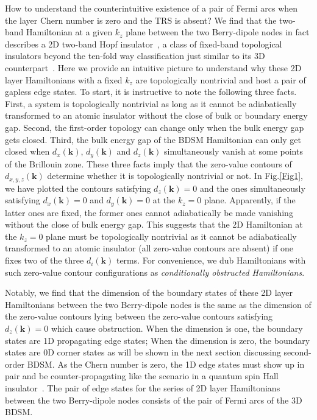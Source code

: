 \documentclass[aps,prl,twocolumn,longbibliography]{revtex4-1}
\newcommand{\bk}{\boldsymbol k}
\begin{document}
How to understand the counterintuitive existence of a pair of Fermi arcs when the layer
Chern number is zero and the TRS is absent?
We find that the two-band Hamiltonian at a given $k_{z}$ plane between the two Berry-dipole nodes
in fact describes a 2D two-band Hopf insulator~\cite{Wang2015hopf}, a class of fixed-band topological insulators beyond
the ten-fold way classification just similar to its 3D counterpart~\cite{Moore2008hopf,Schnyder2008,kitaev2009periodic,Ryu2010}.
Here we provide an intuitive picture
to understand why these 2D layer Hamiltonians with a fixed $k_{z}$ are topologically nontrivial and host
a pair of gapless edge states. To start, it is instructive to note the following three facts. First,
a system is topologically nontrivial as long as it cannot be adiabatically
transformed to an atomic insulator without the close of bulk or boundary energy gap.
Second, the first-order topology can change only when the bulk energy gap
gets closed. Third, the bulk energy gap of the BDSM Hamiltonian can only get closed
when $d_{x}(\bk)$, $d_{y}(\bk)$ and $d_{z}(\bk)$ simultaneously vanish
at some points of the Brillouin zone. These three facts
imply that the zero-value contours of $d_{x,y,z}(\bk)$ determine
whether it is topologically nontrivial or not.  In Fig.\ref{Fig1}, we have plotted the contours
satisfying $d_{z}(\bk)=0$ and the ones simultaneously satisfying $d_{x}(\bk)=0$
and $d_{y}(\bk)=0$  at the $k_{z}=0$ plane. Apparently, if the latter ones are fixed,
the former ones cannot adiabatically be made vanishing without the close of
bulk energy gap. This suggests that the 2D Hamiltonian at the $k_{z}=0$ plane
must be topologically nontrivial as it cannot be adiabatically transformed to an atomic insulator (all zero-value
contours are absent) if one fixes two of the three $d_{i}(\bk)$ terms.
For convenience, we dub Hamiltonians with such zero-value contour configurations
as {\it conditionally obstructed Hamiltonians}.

Notably, we find that the dimension of the boundary states of these 2D layer Hamiltonians
between the two Berry-dipole nodes is the same as the dimension of the zero-value contours lying between
the zero-value contours satisfying  $d_{z}(\bk)=0$ which cause obstruction.
When the dimension is one, the boundary states are 1D propagating
edge states; When the dimension is zero, the boundary states
are 0D corner states as will be shown in the next section discussing second-order BDSM.
As the Chern number is zero, the 1D edge states must show up in pair and be counter-propagating like the scenario
in a quantum spin Hall insulator~\cite{Kane2005a,Kane2005b,Bernevig2006HgTe}. The pair of edge states for the series of 2D layer Hamiltonians
between the two Berry-dipole nodes consists of the pair of Fermi arcs of the 3D BDSM.
\end{document}
